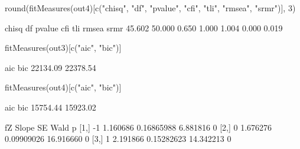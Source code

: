 \begin{Schunk}
\begin{Sinput}
 round(fitMeasures(out4)[c("chisq", "df", "pvalue", "cfi", 
                           "tli", "rmsea", "srmr")], 3)
\end{Sinput}
\begin{Soutput}
 chisq     df pvalue    cfi    tli  rmsea   srmr 
45.602 50.000  0.650  1.000  1.004  0.000  0.019 
\end{Soutput}
\begin{Sinput}
 fitMeasures(out3)[c("aic", "bic")]
\end{Sinput}
\begin{Soutput}
     aic      bic 
22134.09 22378.54 
\end{Soutput}
\begin{Sinput}
 fitMeasures(out4)[c("aic", "bic")]
\end{Sinput}
\begin{Soutput}
     aic      bic 
15754.44 15923.02 
\end{Soutput}
\begin{Soutput}
     fZ    Slope         SE      Wald p
[1,] -1 1.160686 0.16865988  6.881816 0
[2,]  0 1.676276 0.09909026 16.916660 0
[3,]  1 2.191866 0.15282623 14.342213 0
\end{Soutput}
\end{Schunk}
